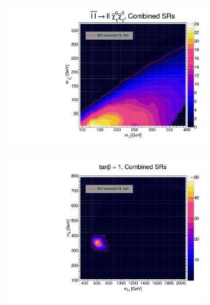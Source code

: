 \documentclass[12pt, a4paper]{book}
\begin{document}
\begin{figure}[!ht]
	\centering
	\begin{subfigure}[b]{0.49\textwidth}
      \centering
      \includegraphics[width=1\textwidth]{Limits/Model_independent/SlepSlep/SlepSlep_ll.pdf}
   \end{subfigure}
   \hfill
   \begin{subfigure}[b]{0.49\textwidth}
      \centering
      \includegraphics[width=1\textwidth]{Limits/Model_independent/2HDM/2HDM_ll_tb1.pdf}
   \end{subfigure}
   \hfill
   \begin{subfigure}[b]{0.49\textwidth}
      \centering

\end{subfigure}
\end{figure}
\end{document}
